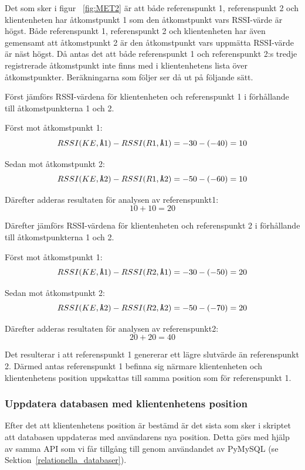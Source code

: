 \documentclass[a4paper,12pt]{article}
\begin{document}
 Det som sker i figur ~\ref{fig:MET2} är att både referenspunkt 1, referenspunkt 2 och klientenheten har åtkomstpunkt 1 som den åtkomstpunkt vars RSSI-värde är högst. Både referenspunkt 1, referenspunkt 2 och klientenheten har även gemensamt att åtkomstpunkt 2 är den åtkomstpunkt vars uppmätta RSSI-värde är näst högst. Då antas det att både referenspunkt 1 och referenspunkt 2:s tredje registrerade åtkomstpunkt inte finns med i klientenhetens lista över åtkomstpunkter. Beräkningarna som följer ser då ut på följande sätt.

 Först jämförs RSSI-värdena för klientenheten och referenspunkt 1 i förhållande till åtkomstpunkterna 1 och 2.

 Först mot åtkomstpunkt 1: $$ RSSI (KE,\verb|Å|1)  -  RSSI (R1,\verb|Å|1) = -30 - (- 40) = 10 $$

 Sedan mot åtkomstpunkt 2: $$ RSSI (KE,\verb|Å|2)  -  RSSI (R1,\verb|Å|2) = -50 - (- 60) = 10 $$

 Därefter adderas resultaten för analysen av referenspunkt1: $$ 10 + 10 = 20$$

 Därefter jämförs RSSI-värdena för klientenheten och referenspunkt 2 i förhållande till åtkomstpunkterna 1 och 2.

 Först mot åtkomstpunkt 1: $$ RSSI (KE,\verb|Å|1)  -  RSSI (R2,\verb|Å|1) = -30 - (- 50) = 20 $$

 Sedan mot åtkomstpunkt 2: $$ RSSI (KE,\verb|Å|2)  -  RSSI (R2,\verb|Å|2) = -50 - (- 70) = 20 $$

 Därefter adderas resultaten för analysen av referenspunkt2: $$ 20 + 20 = 40$$

 Det resulterar i att referenspunkt 1 genererar ett lägre slutvärde än referenspunkt 2. Därmed antas referenspunkt 1 befinna sig närmare klientenheten och klientenhetens position uppskattas till samma position som för referenspunkt 1.

 \subsubsection{Uppdatera databasen med klientenhetens position}
 Efter det att klientenhetens position är bestämd är det sista som sker i skriptet att databasen uppdateras med användarens nya position. Detta görs med hjälp av samma API som vi får tillgång till genom användandet av PyMySQL (se Sektion~\ref{relationella_databaser}).
\end{document}
